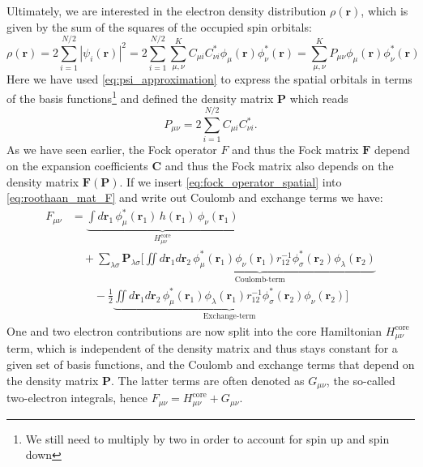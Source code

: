 Ultimately, we are interested in the electron density distribution $\rho(\mathbf{r})$, which is given by the sum of the squares of the occupied spin orbitals: 
\begin{equation}
    \rho(\mathbf{r}) = 2 \sum_{i=1}^{N/2} |\psi_i(\mathbf{r})|^2 = 2 \sum_{i=1}^{N/2} \sum_{\mu,\nu}^{K} C_{\mu i} C_{\nu i}^* \phi_\mu(\mathbf{r}) \phi_\nu^*(\mathbf{r}) = \sum_{\mu,\nu}^{K} P_{\mu \nu} \phi_\mu(\mathbf{r}) \phi_\nu^*(\mathbf{r})
\end{equation}
Here we have used \autoref{eq:psi_approximation} to express the spatial orbitals in terms of the basis functions\footnote{We still need to multiply by two in order to account for spin up and spin down} and defined the density matrix $\mathbf{P}$ which reads
\begin{equation}
    \label{eq:density_matrix}
    P_{\mu \nu} = 2 \sum_{i=1}^{N/2} C_{\mu i} C_{\nu i}^*.
\end{equation}
As we have seen earlier, the Fock operator $F$ and thus the Fock matrix $\mathbf{F}$ depend on the expansion coefficients $\mathbf{C}$ and thus the Fock matrix also depends on the density matrix $\mathbf{F(P)}$. If we insert \autoref{eq:fock_operator_spatial} into \autoref{eq:roothaan_mat_F} and write out Coulomb and exchange terms we have: 
\begin{align}
    \label{eq:fock_full_eq_coul_ex}
        F_{\mu \nu} &= \underbrace{\int d\mathbf{r}_1\, \phi_\mu^*(\mathbf{r}_1)\, h(\mathbf{r}_1)\, \phi_\nu(\mathbf{r}_1) \nonumber}_{H_{\mu\nu}^\text{core}} \\
        &\quad + \sum_{\lambda \sigma} \mathbf{P}_{\lambda \sigma} \Bigg[
            \underbrace{\iint  d\mathbf{r}_1 d\mathbf{r}_2\, \phi_\mu^*(\mathbf{r}_1) \phi_\nu(\mathbf{r}_1) r_{12}^{-1} \phi_\sigma^*(\mathbf{r}_2) \phi_\lambda(\mathbf{r}_2) \nonumber}_{\text{Coulomb-term}} \\
            &\qquad - \frac{1}{2} \underbrace{\iint d\mathbf{r}_1 d\mathbf{r}_2\, \phi_\mu^*(\mathbf{r}_1) \phi_\lambda(\mathbf{r}_1) r_{12}^{-1} \phi_\sigma^*(\mathbf{r}_2) \phi_\nu(\mathbf{r}_2)}_{\text{Exchange-term}}
            \Bigg]
\end{align}
One and two electron contributions are now split into the core Hamiltonian $H_{\mu\nu}^\text{core}$ term, which is independent of the density matrix and thus stays constant for a given set of basis functions, and the Coulomb and exchange terms that depend on the density matrix $\mathbf{P}$. The latter terms are often denoted as $G_{\mu\nu}$, the so-called two-electron integrals, hence $F_{\mu \nu} = H_{\mu\nu}^\text{core} + G_{\mu\nu}$.\\

